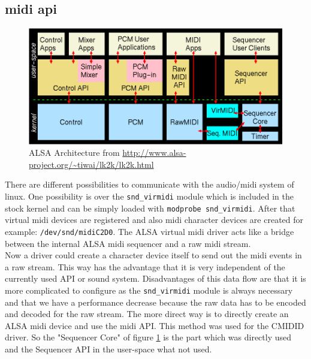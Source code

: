 \documentclass[paper=a4,fontsize=11pt,twocolumn,pagesize,bibtotoc]{scrartcl}
\begin{document}
\subsection{midi api}
\begin{figure}
\includegraphics[keepaspectratio=true,width=\textwidth]{alsa.png}
\caption{ALSA Architecture from \url{http://www.alsa-project.org/~tiwai/lk2k/lk2k.html}}
\label{alsaarch}
\end{figure}
There are different possibilities to communicate with the audio/midi system of linux. One possibility is over the \texttt{snd\_virmidi} module which is included in the stock kernel and can be simply loaded with \texttt{modprobe snd\_virmidi}. After that virtual midi devices are registered and also midi character devices are created for example: \texttt{/dev/snd/midiC2D0}. The ALSA virtual midi driver acts like a bridge between the internal ALSA midi sequencer and a raw midi stream. \\
Now a driver could create a character device itself to send out the midi events in a raw stream. This way has the advantage that it is very independent of the currently used API or sound system. Disadvantages of this data flow are that it is more complicated to configure as the \texttt{snd\_virmidi} module is always necessary and that we have a performance decrease because the raw data has to be encoded and decoded for the raw stream. The more direct way is to directly create an ALSA midi device and use the midi API. This method was used for the CMIDID driver. So the "Sequencer Core" of figure \ref{alsaarch} is the part which was directly used and the Sequencer API in the user-space what not used.
\end{document}
